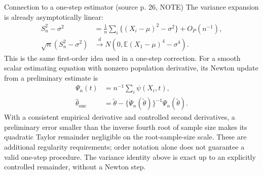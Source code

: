 \documentclass[12pt]{article}
\newcommand{\E}{\mathbb E}
\begin{document}
\begin{conceptbox}{Connection to a one-step estimator (source p. 26, NOTE)}
The variance expansion is already asymptotically linear:
\begin{align}
 S_n^2-\sigma^2&=\frac1n\sum_i\{(X_i-\mu)^2-\sigma^2\}
                  +O_P(n^{-1}),\\
 \sqrt n(S_n^2-\sigma^2)&\xrightarrow{d}
 N\!\left(0,\E(X_1-\mu)^4-\sigma^4\right).
\end{align}
This is the same first-order idea used in a one-step correction. For a
smooth scalar estimating equation with nonzero population derivative,
its Newton update from a preliminary estimate is
\begin{align}
 \Psi_n(t)&=n^{-1}\sum_i\psi(X_i,t),\\
 \widehat\theta_{\mathrm{one}}
 &=\widetilde\theta-\{\dot\Psi_n(\widetilde\theta)\}^{-1}
                         \Psi_n(\widetilde\theta).
\end{align}
With a consistent empirical derivative and controlled second derivatives,
a preliminary error smaller than the inverse fourth root of sample size
makes its quadratic Taylor remainder negligible on the root-sample-size
scale. These are additional regularity requirements; order notation alone
does not guarantee a valid one-step procedure. The variance identity above
is exact up to an explicitly controlled remainder, without a Newton step.
\end{conceptbox}
\end{document}
